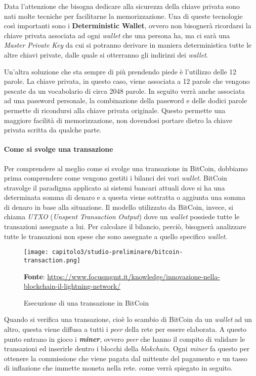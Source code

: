 Data l'attenzione che bisogna dedicare alla sicurezza della chiave privata sono nati molte tecniche per facilitarne la memorizzazione. Una di queste tecnologie così importanti sono i \textbf{Deterministic Wallet}, ovvero non bisognerà ricordarsi la chiave privata associata ad ogni \textit{wallet} che una persona ha, ma ci sarà una \textit{Master Private Key} da cui si potranno derivare in maniera deterministica tutte le altre chiavi private, dalle quale si otterranno gli indirizzi dei \textit{wallet}. 

Un'altra soluzione che sta sempre di più prendendo piede è l'utilizzo delle 12 parole. La chiave privata, in questo caso, viene associata a 12 parole che vengono pescate da un vocabolario di circa 2048 parole. In seguito verrà anche associata ad una password personale, la combinazione della password e delle dodici parole permette di ricondursi alla chiave privata originale. Questo permette una maggiore facilità di memorizzazione, non dovendosi portare dietro la chiave privata scritta da qualche parte.   

\paragraph{Come si svolge una transazione}
Per comprendere al meglio come si svolge una transazione in BitCoin, dobbiamo prima comprendere come vengono gestiti i bilanci dei vari \textit{wallet}. BitCoin stravolge il paradigma applicato ai sistemi bancari attuali dove si ha una determinata somma di denaro e a questa viene sottratta o aggiunta una somma di denaro in base alla situazione. Il modello utilizzato da BitCoin, invece, si chiama \textit{UTXO} (\textit{Unspent Transaction Output}) dove un \textit{wallet} possiede tutte le transazioni assegnate a lui. Per calcolare il bilancio, perciò, bisognerà analizzare tutte le transazioni non spese che sono assegnate a quello specifico \textit{wallet}.

\begin{figure}[h!]
  \centering
  \texttt{[image: capitolo3/studio-preliminare/bitcoin-transaction.png]}
  \caption{Esecuzione di una transazione in BitCoin}
  \textbf{Fonte}: \href{https://www.focusmgmt.it/knowledge/innovazione-nella-blockchain-il-lightning-network/}{https://www.focusmgmt.it/knowledge/innovazione-nella-blockchain-il-lightning-network/}
\end{figure}

Quando si verifica una transazione, cioè lo scambio di BitCoin da un \textit{wallet} ad un altro, questa viene diffusa a tutti i \textit{peer} della rete per essere elaborata. A questo punto entrano in gioco i \textit{\textbf{miner}}, ovvero \textit{peer} che hanno il compito di validare le transazioni ed inserirle dentro i blocchi della \textit{blokchain}. Ogni \textit{miner} fa questo per ottenere la commissione che viene pagata dal mittente del pagamento e un tasso di inflazione che immette moneta nella rete. come verrà spiegato in seguito. 

